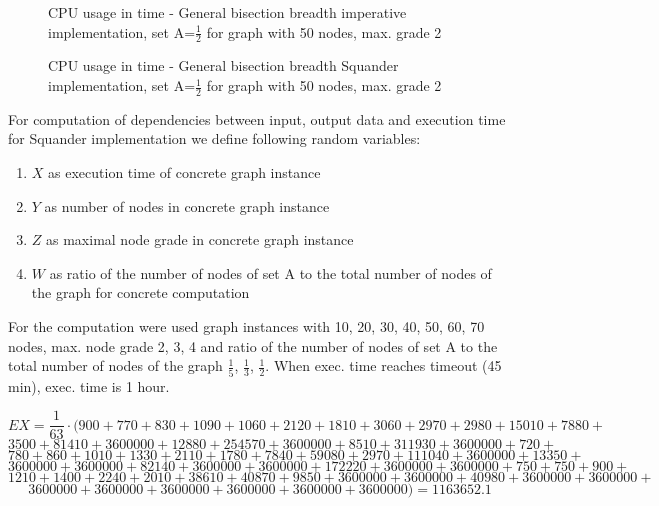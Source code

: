 \documentclass[11pt,twoside,a4paper]{book}
\begin{document}
\begin{figure}
\begin{center}

\caption{CPU usage in time - General bisection breadth imperative
implementation, set A=$\frac{1}{2}$ for graph with 50 nodes, max. grade 2}
\label{fig:gbbICpu50212}
\end{center}
\end{figure}

\begin{figure}
\begin{center}

\caption{CPU usage in time - General bisection breadth Squander
implementation, set A=$\frac{1}{2}$ for graph with 50 nodes, max. grade 2}
\label{fig:gbbSCpu50212}
\end{center}
\end{figure}
\clearpage
For computation of dependencies between input, output data and execution
time for Squander implementation we define following
random variables:
\begin{enumerate}
  \item $X$ as execution time of concrete graph instance
  \item $Y$ as number of nodes in concrete graph instance
  \item $Z$ as maximal node grade in concrete graph instance
  \item $W$ as ratio of the number of nodes of set A to the total number of
  nodes of the graph for concrete computation
\end{enumerate}
For the computation were used graph instances with 10, 20, 30, 40, 50, 60, 70
nodes, max. node grade 2, 3, 4 and ratio of the number of nodes of set A to the total number of
  nodes of the graph  $\frac{1}{5}$, $\frac{1}{3}$, $\frac{1}{2}$. When exec.
  time reaches timeout (45 min), exec. time is 1 hour.

$$EX = \frac{1}{63}\cdot(900  + 770  +830  + 1090  + 1060  
 + 2 120 + 1 810+ 3 060 + 2970 + 2 980 + 15 010 + 7 880
+$$
$$3500 + 81 410 +3600000+12 880+254 570+ 3600000 + 8510+311 930 +3600000+ 720
+$$ $$780 + 860 + 1010 +1330 + 2110 +1780 +7840 +59 080 +2 970 +111 040+
3600 000 +13 350 +$$ $$3600 000 +3600 000+82 140 +3600 000 +3600000+172 220 +3600
000 + 3600000 +750+ 750+ 900+$$ $$ 1 210 +1400 + 2 240 +2 010 +38 610 +40
870 +9850 +3600000+ 3600000+40 980 +3600000 +3600000+$$ $$3600000+3600000+
3600000+3600000 +3600000 +3600000) =1163652.1$$
\end{document}
